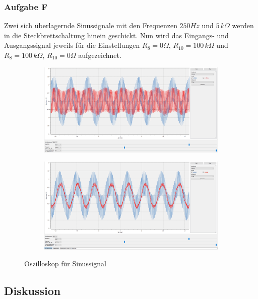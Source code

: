 \subsubsection{Aufgabe F}
Zwei sich überlagernde Sinussignale mit den Frequenzen $\si{250}{Hz}$ und $\si{5}{\,k\Omega}$ werden in die Steckbrettschaltung hinein geschickt. Nun wird das Eingangs- und Ausgangssignal jeweils für die Einstellungen $R_{8}=\si{0}{\Omega}$, $R_{10}=\si{100}{\,k\Omega}$ und $R_{8}=\si{100}{\,k\Omega}$, $R_{10}=\si{0}{\Omega}$ aufgezeichnet.

\begin{figure}[h]
\centering
\begin{subfigure}{1\textwidth}
\centering
  \includegraphics[width=17cm]{pics/3.3f_0_100}
  \label{sin0_1}
\end{subfigure}
\begin{subfigure}{1\textwidth}
\centering
  \includegraphics[width=17cm]{pics/3.3f_100_0}
  \label{sin1_0}
\end{subfigure}
\caption{Oszilloskop für Sinussignal}
\end{figure}



\subsection{Diskussion}




